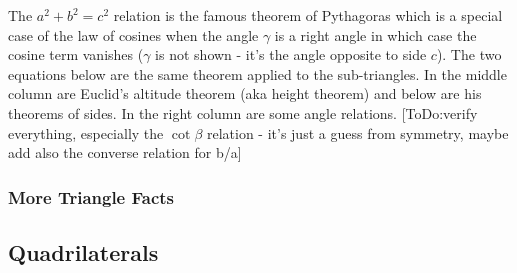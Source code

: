 The $a^2 + b^2 = c^2$ relation is the famous theorem of Pythagoras which is a special case of the law of cosines when the angle $\gamma$ is a right angle in which case the cosine term vanishes ($\gamma$ is not shown - it's the angle opposite to side $c$). The two equations below are the same theorem applied to the sub-triangles. In the middle column are Euclid's altitude theorem (aka height theorem) and below are his theorems of sides. In the right column are some angle relations. [ToDo:verify everything, especially the $\cot \beta$ relation - it's just a guess from symmetry, maybe add also the converse relation for b/a] 





\subsubsection{More Triangle Facts}



\subsection{Quadrilaterals}


